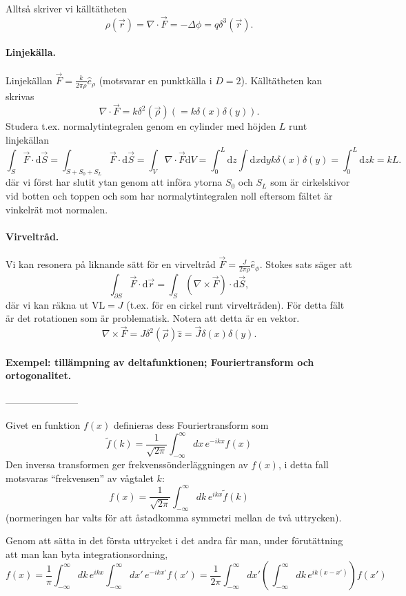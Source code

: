 \documentclass[%
oneside,                 %
final,                   %
10pt]{article}
\begin{document}
\noindent
Alltså skriver vi källtätheten 
$$
\rho(\vec{r}) = \nabla \cdot \vec{F} = -\Delta \phi = q \delta^3(\vec{r}).
$$

\paragraph{Linjekälla.}
Linjekällan $\vec{F} = \frac{k}{2 \pi \rho} \hat{e}_\rho$ (motsvarar en punktkälla i $D=2$).
Källtätheten kan skrivas
$$
\nabla \cdot \vec{F} = k \delta^2(\vec{\rho}) \left( = k \delta(x) \delta(y) \right).
$$
Studera t.ex. normalytintegralen genom en cylinder med höjden $L$ runt linjekällan
$$
\int_S \vec{F} \cdot \mbox{d}\vec{S} = \int_{S+S_0+S_L} \vec{F} \cdot \mbox{d}\vec{S} = \int_V \nabla \cdot \vec{F} \mbox{d} V = \int_0^L \mbox{d} z \int \mbox{d}x \mbox{d}y k \delta(x)\delta(y) = \int_0^L \mbox{d} z k = k L.
$$
där vi först har slutit ytan genom att införa ytorna $S_0$ och $S_L$ som är cirkelskivor vid botten och toppen och som har normalytintegralen noll eftersom fältet är vinkelrät mot normalen.

\paragraph{Virveltråd.}
Vi kan resonera på liknande sätt för en virveltråd $\vec{F} = \frac{J}{2 \pi \rho} \hat{e}_\phi$. Stokes sats säger att
$$
\int_{\partial S} \vec{F} \cdot \mbox{d} \vec{r} = \int_S (\nabla \times \vec{F}) \cdot \mbox{d} \vec{S},
$$
där vi kan räkna ut $\mathrm{VL} = J$ (t.ex. för en cirkel runt virveltråden). För detta fält är det rotationen som är problematisk. Notera att detta är en vektor.
$$
\nabla \times \vec{F} = J \delta^2(\vec{\rho}) \hat{z} = \vec{J} \delta(x)\delta(y).
$$

\paragraph{Exempel: tillämpning av deltafunktionen; Fouriertransform och ortogonalitet.}
-----------------------

Givet en funktion $f(x)$ definieras dess Fouriertransform som
$$
\tilde f(k)=\frac{1}{\sqrt{2\pi}}\int_{-\infty}^\infty dx\,e^{-ikx}f(x)
$$
Den inversa transformen ger frekvenssönderläggningen av $f(x)$, i detta fall motsvaras ``frekvensen'' av vågtalet $k$:
$$
f(x)=\frac{1}{\sqrt{2\pi}}\int_{-\infty}^\infty dk\,e^{ikx}\tilde f(k)
$$
(normeringen har valts för att åstadkomma symmetri mellan de två uttrycken).

Genom att sätta in det första uttrycket i det andra får man, under förutättning att man kan byta integrationsordning,
$$
f(x)=\frac{1}{\pi}\int_{-\infty}^\infty dk\,e^{ikx}
\int_{-\infty}^\infty dx'\,e^{-ikx'}f(x')=
\frac{1}{2\pi}\int_{-\infty}^\infty dx'
\left(\,\int_{-\infty}^\infty dk\,e^{ik(x-x')}\right)f(x')
$$
\end{document}
